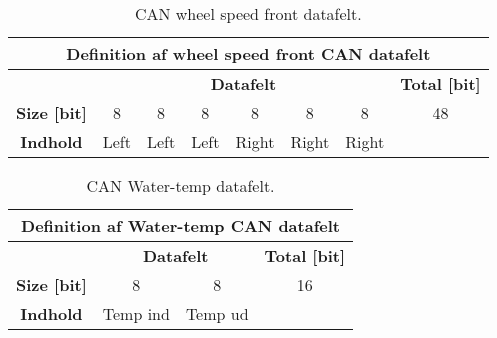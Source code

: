 \begin{table}[H] \centering
	\begin{tabular}{|c||c|c|c|c|c|c|c|}
        \hline \multicolumn{8}{|c|}{\textbf{Definition af wheel speed front CAN datafelt}} \\
	    \hline \hline & \multicolumn{6}{|c|}{\textbf{Datafelt}} & \textbf{Total [bit]}\\ 
        \hline \textbf{Size [bit]} & 8 & 8 & 8 & 8 & 8 & 8 & 48 \\
        \hline \textbf{Indhold} & Left & Left & Left & Right & Right & Right & \\
        \hline
    \end{tabular}
\caption{CAN wheel speed front datafelt.}
\label{table:CAN_WhlSpdF_pakke}
\end{table}

\begin{table}[H] \centering
	\begin{tabular}{|c||c|c|c|}
        \hline \multicolumn{4}{|c|}{\textbf{Definition af Water-temp CAN datafelt}} \\
	\hline \hline & \multicolumn{2}{|c|}{\textbf{Datafelt}} & \textbf{Total [bit]}\\ 
        \hline \textbf{Size [bit]} & 8 & 8 & 16 \\
        \hline \textbf{Indhold} & Temp ind & Temp ud & \\
        \hline
    \end{tabular}
\caption{CAN Water-temp datafelt.}
\label{table:CAN_WatTmp_pakke}
\end{table}







